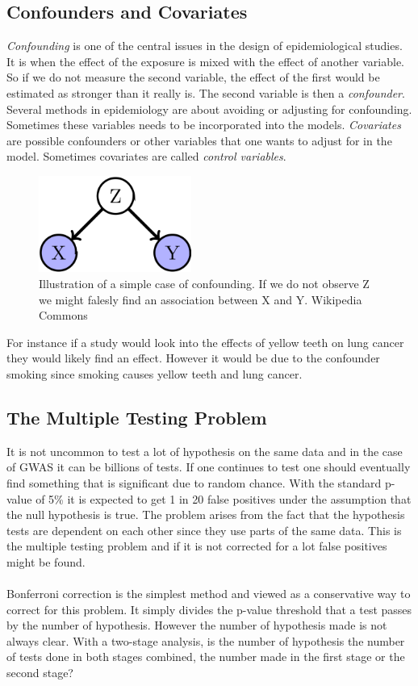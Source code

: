 \documentclass[10pt,a4paper]{report}
\begin{document}
\subsection{Confounders and Covariates}
\emph{Confounding} is one of the central issues in the design of epidemiological studies. It is when the effect of the exposure is mixed with the effect of another variable. So if we do not measure the second variable, the effect of the first would be estimated as stronger than it really is. The second variable is then a \emph{confounder}. Several methods in epidemiology are about avoiding or adjusting for confounding. Sometimes these variables needs to be incorporated into the models. \emph{Covariates} are possible confounders or other variables that one wants to adjust for in the model. Sometimes covariates are called \emph{control variables}.\cite{rothman2002intro_epidemiology,rothman1998modern}

\begin{figure}[h]
    \centering
    \includegraphics[width=5cm]{Simple_Confounding_Case.png}
    \caption{Illustration of a simple case of confounding. If we do not observe Z we might falesly find an association between X and Y. Wikipedia Commons}
    \label{fig:confunding}
\end{figure}

For instance if a study would look into the effects of yellow teeth on lung cancer they would likely find an effect. However it would be due to the confounder smoking since smoking causes yellow teeth and lung cancer.

\subsection{The Multiple Testing Problem}
It is not uncommon to test a lot of hypothesis on the same data and in the case of GWAS it can be billions of tests. If one continues to test one should eventually find something that is significant due to random chance. With the standard p-value of 5\% it is expected to get 1 in 20 false positives under the assumption that the null hypothesis is true. The problem arises from the fact that the hypothesis tests are dependent on each other since they use parts of the same data. This is the multiple testing problem and if it is not corrected for a lot false positives might be found.\cite{bonferroni_multiple}\\
\\
Bonferroni correction is the simplest method and viewed as a conservative way to correct for this problem. It simply divides the p-value threshold that a test passes by the number of hypothesis. However the number of hypothesis made is not always clear. With a two-stage analysis, is the number of hypothesis the number of tests done in both stages combined, the number made in the first stage or the second stage?\cite{bonferroni_multiple}
\end{document}
